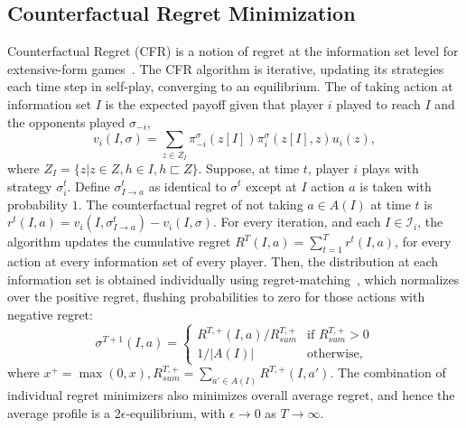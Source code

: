 \documentclass[letterpaper]{article}
\newcommand{\cI}{\mathcal{I}}
\newcommand{\defword}[1]{\textbf{\boldmath{#1}}}
\begin{document}
\subsection{Counterfactual Regret Minimization}

Counterfactual Regret (CFR) is a notion of regret at the information set level for extensive-form games~\cite{CFR}. 
The CFR algorithm is iterative, updating its strategies each time step in self-play, converging to an equilibrium. 
The \defword{counterfactual value} of taking action 
at information set $I$ is the expected payoff given that player $i$ played to reach $I$ and the opponents played 
$\sigma_{-i}$, 
\begin{equation}
\label{eq:cfv}
v_i(I,\sigma) = \sum_{z \in Z_I} \pi^{\sigma}_{-i}(z[I]) \pi^{\sigma}_{i}(z[I],z) u_i(z),
\end{equation}
where $Z_I = \{ z | z \in Z, h \in I, h \sqsubset Z \}$. 
Suppose, at time $t$, player $i$ plays with strategy $\sigma^t_i$. 
Define $\sigma^t_{I \rightarrow a}$ as identical to $\sigma^t$ except at $I$ action $a$ is taken with probability $1$. 
The counterfactual regret of not taking $a \in A(I)$ at time $t$ is $r^t(I,a) = v_i(I,\sigma^t_{I \rightarrow a}) - v_i(I,\sigma)$. 
For every iteration, and each $I \in \cI_i$, the algorithm updates the cumulative regret $R^T(I,a) = \sum_{t=1}^T r^t(I,a)$, for every
action at every information set of every player. 
Then, the distribution at each information set is obtained individually using regret-matching~\cite{Hart00}, which normalizes over the 
positive regret, flushing probabilities to zero for those actions with negative regret:
\begin{equation}
\label{eq:rm}
\sigma^{T+1}(I,a) = \left\{
\begin{array}{ll}
R^{T,+}(I,a) / R^{T,+}_{sum} & \mbox{if } R^{T,+}_{sum} > 0 \\ 
1 / |A(I)|                   & \mbox{otherwise,}
\end{array} \right.
\end{equation}
where $x^+ = \max(0,x), R^{T,+}_{sum} = \sum_{a' \in A(I)} R^{T,+}(I,a')$. 
The combination of individual regret minimizers
also minimizes overall average regret, and hence the average profile is a $2\epsilon$-equilibrium, with $\epsilon \rightarrow 0$
as $T \rightarrow \infty$.
\end{document}
